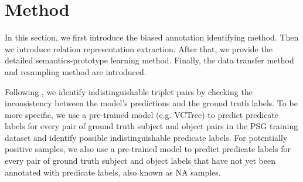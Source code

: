 \documentclass[letterpaper]{article} %
\begin{document}
\section{Method}
In this section, we first introduce the biased annotation identifying method. Then we introduce relation representation extraction. After that, we provide the detailed semantics-prototype learning method. Finally, the data transfer method and resampling method are introduced.


 Following \citet{zhang2022fine}, we identify indistinguishable triplet pairs by checking the inconsistency between the model's predictions and the ground truth labels. To be more specific, we use a pre-trained model (e.g. VCTree\cite{Tang_2019_CVPR}) to predict predicate labels for every pair of ground truth subject and object pairs in the PSG training dataset and identify possible indistinguishable predicate labels.
For potentially positive samples, we also use a pre-trained model to predict predicate labels for every pair of ground truth subject and object labels that have not yet been annotated with predicate labels, also known as NA samples.




\end{document}

